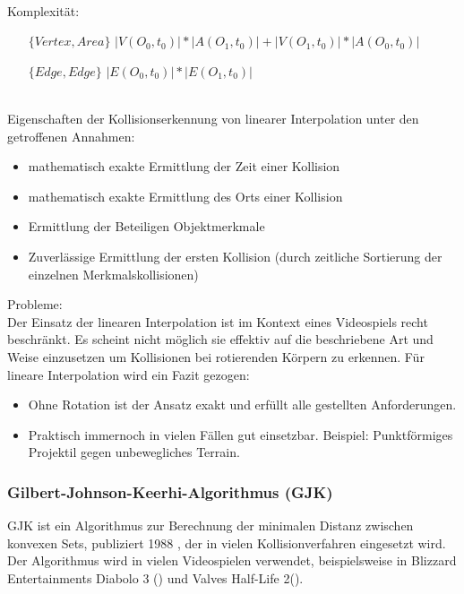\ \\
		Komplexität:
\begin{itemize}
			\item [$\{Vertex, Area\}$] $|V(O_0, t_0)|* |A(O_1, t_0)| + |V(O_1, t_0)|*|A(O_0, t_0)|$
			\item [$\{Edge, Edge\}$] $|E(O_0, t_0)| * |E(O_1, t_0)|$
		\end{itemize}
\ \\
		Eigenschaften der Kollisionserkennung von linearer Interpolation unter den getroffenen Annahmen:
		\begin{itemize}
			\item mathematisch exakte Ermittlung der Zeit einer Kollision
			\item mathematisch exakte Ermittlung des Orts einer Kollision
			\item Ermittlung der Beteiligen Objektmerkmale
			\item Zuverlässige Ermittlung der ersten Kollision (durch zeitliche Sortierung der einzelnen Merkmalskollisionen)
		\end{itemize}
Probleme:\\
Der Einsatz der linearen Interpolation ist im Kontext eines Videospiels recht beschränkt.
Es scheint nicht möglich sie effektiv auf die beschriebene Art und Weise einzusetzen um Kollisionen bei rotierenden Körpern zu erkennen.
Für lineare Interpolation wird ein Fazit gezogen:
\begin{itemize}
	\item Ohne Rotation ist der Ansatz exakt und erfüllt alle gestellten Anforderungen.
	\item Praktisch immernoch in vielen Fällen gut einsetzbar. Beispiel: Punktförmiges Projektil gegen unbewegliches Terrain.
\end{itemize}

\subsubsection{Gilbert-Johnson-Keerhi-Algorithmus (GJK)}
GJK ist ein Algorithmus zur Berechnung der minimalen Distanz zwischen konvexen Sets, publiziert 1988 \cite{gjk}, der in vielen Kollisionverfahren eingesetzt wird.\\
		Der Algorithmus wird in vielen Videospielen verwendet, beispielsweise in Blizzard Entertainments Diabolo 3 (\cite{gdc-physics}) und Valves Half-Life 2(\cite{gjk-blog}).\\
		
